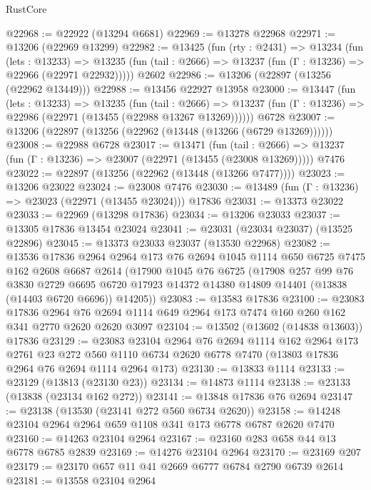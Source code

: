 \begin{lexlean}{RustCore}
\begin{coremodule}
@22968 := @22922 (@13294 @6681)
@22969 := @13278 @22968
@22971 := @13206 (@22969 @13299)
@22982 := @13425
    (fun (rty : @2431) =>
    @13234
      (fun (lets : @13233) =>
      @13235 (fun (tail : @2666) => @13237 (fun (Γ : @13236) => @22966 (@22971 @22932)))))
    @2602
@22986 := @13206 (@22897 (@13256 (@22962 @13449)))
@22988 := @13456 @22927 @13958
@23000 := @13447
    (fun (lets : @13233) =>
    @13235
      (fun (tail : @2666) =>
      @13237 (fun (Γ : @13236) => @22986 (@22971 (@13455 (@22988 @13267 @13269))))))
    @6728
@23007 := @13206 (@22897 (@13256 (@22962 (@13448 (@13266 (@6729 @13269))))))
@23008 := @22988 @6728
@23017 := @13471
    (fun (tail : @2666) => @13237 (fun (Γ : @13236) => @23007 (@22971 (@13455 (@23008 @13269)))))
    @7476
@23022 := @22897 (@13256 (@22962 (@13448 (@13266 @7477))))
@23023 := @13206 @23022
@23024 := @23008 @7476
@23030 := @13489 (fun (Γ : @13236) => @23023 (@22971 (@13455 @23024))) @17836
@23031 := @13373 @23022
@23033 := @22969 (@13298 @17836)
@23034 := @13206 @23033
@23037 := @13305 @17836 @13454 @23024
@23041 := @23031 (@23034 @23037) (@13525 @22896)
@23045 := @13373 @23033 @23037 (@13530 @22968)
@23082 := @13536
    @17836
    @2964
    @2964
    @173
    @76
    @2694
    @1045
    @1114
    @650
    @6725
    @7475
    @162
    @2608
    @6687
    @2614
    (@17900
      @1045
      @76
      @6725
      (@17908
        @257
        @99
        @76
        @3830
        @2729
        @6695
        @6720
        @17923
        @14372
        @14380
        @14809
        @14401
        (@13838 (@14403 @6720 @6696))
        @14205))
@23083 := @13583 @17836
@23100 := @23083
    @17836
    @2964
    @76
    @2694
    @1114
    @649
    @2964
    @173
    @7474
    @160
    @260
    @162
    @341
    @2770
    @2620
    @2620
    @3097
@23104 := @13502 (@13602 (@14838 @13603)) @17836
@23129 := @23083
    @23104
    @2964
    @76
    @2694
    @1114
    @162
    @2964
    @173
    @2761
    @23
    @272
    @560
    @1110
    @6734
    @2620
    @6778
    @7470
    (@13803 @17836 @2964 @76 @2694 @1114 @2964 @173)
@23130 := @13833 @1114
@23133 := @23129 (@13813 (@23130 @23))
@23134 := @14873 @1114
@23138 := @23133 (@13838 (@23134 @162 @272))
@23141 := @13848 @17836 @76 @2694
@23147 := @23138 (@13530 (@23141 @272 @560 @6734 @2620))
@23158 := @14248 @23104 @2964 @2964 @659 @1108 @341 @173 @6778 @6787 @2620 @7470
@23160 := @14263 @23104 @2964
@23167 := @23160 @283 @658 @44 @13 @6778 @6785 @2839
@23169 := @14276 @23104 @2964
@23170 := @23169 @207
@23179 := @23170 @657 @11 @41 @2669 @6777 @6784 @2790 @6739 @2614
@23181 := @13558 @23104 @2964

\end{coremodule}
\end{lexlean}
